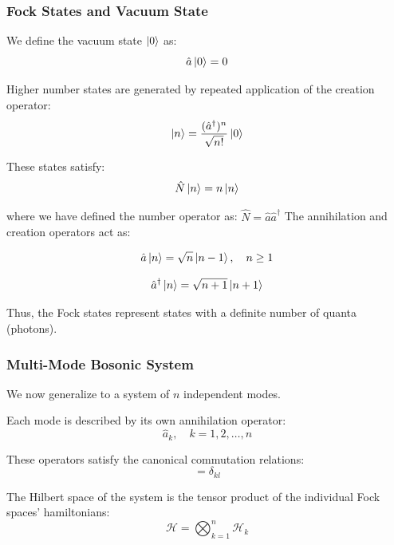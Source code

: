 \subsubsection{Fock States and Vacuum State}

We define the vacuum state $\ket{0}$ as:
\begin{equation}
\hat{a} \ket{0} = 0
\end{equation}

Higher number states are generated by repeated application of the creation operator:
\begin{equation}
\ket{n} = \frac{(\hat{a}^\dagger)^n}{\sqrt{n!}} \ket{0}
\end{equation}

These states satisfy:
\begin{equation}
\hat{N} \ket{n} = n \ket{n}
\end{equation}

where we have defined the number operator as: $\hat{N} = \hat{a}\hat{a}^\dagger$
The annihilation and creation operators act as:

\begin{equation*}
\hat{a}\ket{n} = \sqrt{n}\ket{n-1}, \quad n \geq 1
\end{equation*}

\begin{equation*}
\hat{a}^\dagger \ket{n} = \sqrt{n+1}\ket{n+1}
\end{equation*}

Thus, the Fock states represent states with a definite number of quanta (photons).

\subsubsection{Multi-Mode Bosonic System}

We now generalize to a system of $n$ independent modes.

Each mode is described by its own annihilation operator:
\begin{equation*}
\hat{a}_k, \quad k = 1,2,\dots,n
\end{equation*}

These operators satisfy the canonical commutation relations:
\begin{equation}
[\hat{a}_k, \hat{a}_l^\dagger] = \delta_{kl}
\end{equation}

The Hilbert space of the system is the tensor product of the individual Fock spaces' hamiltonians:
\begin{equation}
\mathcal{H} = \bigotimes_{k=1}^{n} \mathcal{H}_k
\end{equation}

